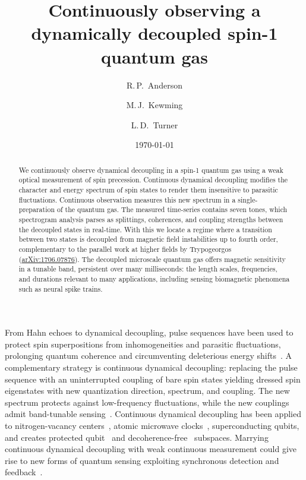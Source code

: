 \documentclass[aps,prl,reprint,superscriptaddress,floatfix]{revtex4-1}
\begin{document}
\title{Continuously observing a dynamically decoupled spin-1 quantum gas}

\author{R.\,P.~Anderson}
\author{M.\,J.~Kewming}
\author{L.\,D.~Turner}

\date{\today}

\begin{abstract}
We continuously observe dynamical decoupling in a spin-1 quantum gas using a weak optical measurement of spin precession.
Continuous dynamical decoupling modifies the character and energy spectrum of spin states to render them insensitive to parasitic fluctuations. 
Continuous observation measures this new spectrum in a single-preparation of the quantum gas.
The measured time-series contains seven tones, which spectrogram analysis parses as splittings, coherences, and coupling strengths between the decoupled states in real-time.
With this we locate a regime where a transition between two states is decoupled from magnetic field instabilities up to fourth order, complementary to the parallel work at higher fields by Trypogeorgos \etal (\href{https://arxiv.org/abs/1706.07876}{arXiv:1706.07876}).
The decoupled microscale quantum gas offers magnetic sensitivity in a tunable band, persistent over many milliseconds: the length scales, frequencies, and durations relevant to many applications, including sensing biomagnetic phenomena such as neural spike trains.
\end{abstract}

\maketitle

From Hahn echoes to dynamical decoupling, pulse sequences have been used to protect spin superpositions from inhomogeneities and parasitic fluctuations, prolonging quantum coherence and circumventing deleterious energy shifts~\cite{biercuk_optimized_2009,lange_universal_2010,bluhm_dephasing_2011}.
A complementary strategy is continuous dynamical decoupling: replacing the pulse sequence with an uninterrupted coupling of bare spin states yielding dressed spin eigenstates with new quantization direction, spectrum, and coupling.
The new spectrum protects against low-frequency fluctuations, while the new couplings admit band-tunable sensing~\cite{fanchini_continuously_2007}.
Continuous dynamical decoupling has been applied to nitrogen-vacancy centers~\cite{hirose_continuous_2012,loretz_radio-frequency_2013,cai_robust_2012,*cai_long-lived_2012,golter_protecting_2014}, atomic microwave clocks~\cite{kazakov_magic_2015,sarkany_controlling_2014}, superconducting qubits, and creates protected qubit~\cite{aharon_general_2013,baumgart_ultrasensitive_2016} and decoherence-free~\cite{facchi_quantum_2002,*facchi_unification_2004} subspaces.
Marrying continuous dynamical decoupling with weak continuous measurement could give rise to new forms of quantum sensing exploiting synchronous detection and feedback~\cite{vijay_stabilizing_2012}.
\end{document}
